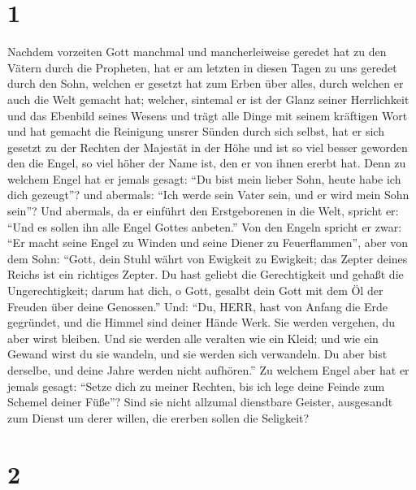 \hypertarget{section}{%
\section{1}\label{section}}

 Nachdem vorzeiten Gott manchmal und mancherleiweise geredet
hat zu den Vätern durch die Propheten,  hat er am letzten in
diesen Tagen zu uns geredet durch den Sohn, welchen er gesetzt hat zum
Erben über alles, durch welchen er auch die Welt gemacht hat;
 welcher, sintemal er ist der Glanz seiner Herrlichkeit und
das Ebenbild seines Wesens und trägt alle Dinge mit seinem kräftigen
Wort und hat gemacht die Reinigung unsrer Sünden durch sich selbst, hat
er sich gesetzt zu der Rechten der Majestät in der Höhe  und
ist so viel besser geworden den die Engel, so viel höher der Name ist,
den er von ihnen ererbt hat.  Denn zu welchem Engel hat er
jemals gesagt: ``Du bist mein lieber Sohn, heute habe ich dich
gezeugt''? und abermals: ``Ich werde sein Vater sein, und er wird mein
Sohn sein''?  Und abermals, da er einführt den Erstgeborenen
in die Welt, spricht er: ``Und es sollen ihn alle Engel Gottes
anbeten.''  Von den Engeln spricht er zwar: ``Er macht seine
Engel zu Winden und seine Diener zu Feuerflammen'',  aber
von dem Sohn: ``Gott, dein Stuhl währt von Ewigkeit zu Ewigkeit; das
Zepter deines Reichs ist ein richtiges Zepter.  Du hast
geliebt die Gerechtigkeit und gehaßt die Ungerechtigkeit; darum hat
dich, o Gott, gesalbt dein Gott mit dem Öl der Freuden über deine
Genossen.''  Und: ``Du, HERR, hast von Anfang die Erde
gegründet, und die Himmel sind deiner Hände Werk.  Sie
werden vergehen, du aber wirst bleiben. Und sie werden alle veralten wie
ein Kleid;  und wie ein Gewand wirst du sie wandeln, und
sie werden sich verwandeln. Du aber bist derselbe, und deine Jahre
werden nicht aufhören.''  Zu welchem Engel aber hat er
jemals gesagt: ``Setze dich zu meiner Rechten, bis ich lege deine Feinde
zum Schemel deiner Füße''?  Sind sie nicht allzumal
dienstbare Geister, ausgesandt zum Dienst um derer willen, die ererben
sollen die Seligkeit?

\hypertarget{section-1}{%
\section{2}\label{section-1}}

